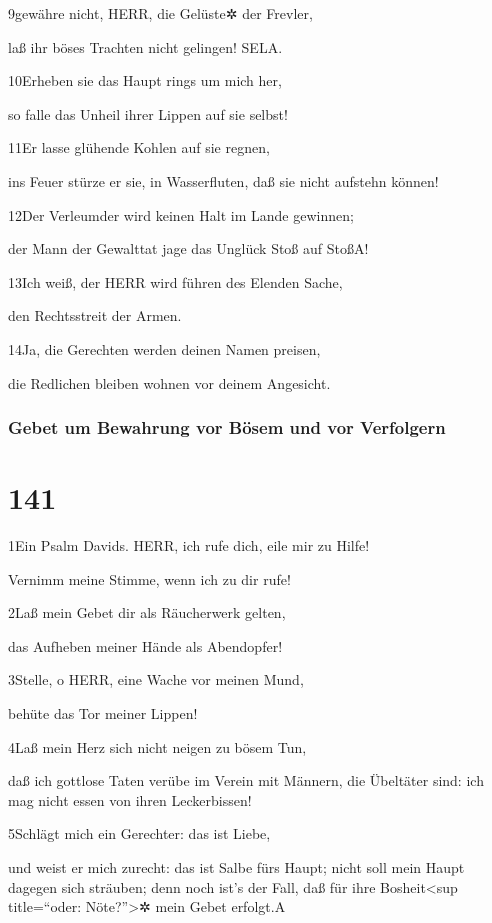 9gewähre nicht, HERR, die Gelüste✲ der Frevler,

laß ihr böses Trachten nicht gelingen! SELA.

10Erheben sie das Haupt rings um mich her,

so falle das Unheil ihrer Lippen auf sie selbst!

11Er lasse glühende Kohlen auf sie regnen,

ins Feuer stürze er sie, in Wasserfluten, daß sie nicht aufstehn können!

12Der Verleumder wird keinen Halt im Lande gewinnen;

der Mann der Gewalttat jage das Unglück Stoß auf Stoß{A}!

13Ich weiß, der HERR wird führen des Elenden Sache,

den Rechtsstreit der Armen.

14Ja, die Gerechten werden deinen Namen preisen,

die Redlichen bleiben wohnen vor deinem Angesicht.

\hypertarget{gebet-um-bewahrung-vor-buxf6sem-und-vor-verfolgern}{%
\subsubsection{Gebet um Bewahrung vor Bösem und vor
Verfolgern}\label{gebet-um-bewahrung-vor-buxf6sem-und-vor-verfolgern}}

\hypertarget{section-140}{%
\section{141}\label{section-140}}

1Ein Psalm Davids. HERR, ich rufe dich, eile mir zu Hilfe!

Vernimm meine Stimme, wenn ich zu dir rufe!

2Laß mein Gebet dir als Räucherwerk gelten,

das Aufheben meiner Hände als Abendopfer!

3Stelle, o HERR, eine Wache vor meinen Mund,

behüte das Tor meiner Lippen!

4Laß mein Herz sich nicht neigen zu bösem Tun,

daß ich gottlose Taten verübe im Verein mit Männern, die Übeltäter sind:
ich mag nicht essen von ihren Leckerbissen!

5Schlägt mich ein Gerechter: das ist Liebe,

und weist er mich zurecht: das ist Salbe fürs Haupt; nicht soll mein
Haupt dagegen sich sträuben; denn noch ist's der Fall, daß für ihre
Bosheit\textless sup title=``oder: Nöte?''\textgreater✲ mein Gebet
erfolgt.{A}

